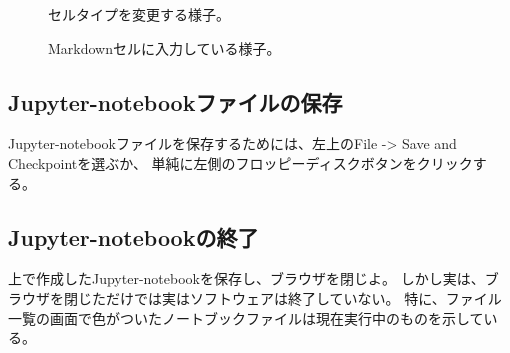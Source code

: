 \begin{figure}[htbp]
	\centering
	\caption{
		\label{fig:Cell_type}
		セルタイプを変更する様子。
	}
\end{figure}
\begin{figure}[htbp]
	\centering
	\caption{
		\label{fig:markdown}
		Markdownセルに入力している様子。
	}
\end{figure}





\subsection{Jupyter-notebookファイルの保存}
Jupyter-notebookファイルを保存するためには、左上の{\ttfamily File -> Save and Checkpoint}を選ぶか、
単純に左側のフロッピーディスクボタンをクリックする。

\subsection{Jupyter-notebookの終了}
上で作成したJupyter-notebookを保存し、ブラウザを閉じよ。
しかし実は、ブラウザを閉じただけでは実はソフトウェアは終了していない。
特に、ファイル一覧の画面で色がついたノートブックファイルは現在実行中のものを示している。

